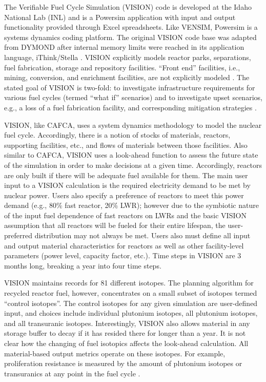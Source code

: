 The Verifiable Fuel Cycle Simulation (VISION) code is developed at the Idaho
National Lab (INL) and is a Powersim \cite{studio_powersim_2003} application
with input and output functionality provided through Excel spreadsheets. Like
VENSIM, Powersim is a systems dynamics coding platform. The original VISION code
base was adapted from DYMOND \cite{moisseytsev_dymond_2001} after internal
memory limits were reached in its application language, iThink/Stella
\cite{richmond_ithink_2004}. VISION explicitly models reactor parks, 
separations, fuel fabrication, storage and repository facilities. ``Front end''
facilities, i.e., mining, conversion, and enrichment facilities, are not
explicitly modeled \cite{guerin_benchmark_2009}. The stated goal of VISION is
two-fold: to investigate infrastructure requirements for various fuel cycles
(termed ``what if'' scenarios) \cite{jacobson_verifiable_2010} and to
investigate upset scenarios, e.g., a loss of a fuel fabrication facility, and
corresponding mitigation strategies \cite{schweitzer_improved_2008}.

VISION, like CAFCA, uses a system dynamics methodology to model the nuclear fuel
cycle. Accordingly, there is a notion of stocks of materials, reactors,
supporting facilities, etc., and flows of materials between those
facilities. Also similar to CAFCA, VISION uses a look-ahead function to assess
the future state of the simulation in order to make decisions at a given
time. Accordingly, reactors are only built if there will be adequate fuel
available for them. The main user input to a VISION calculation is the required
electricity demand to be met by nuclear power. Users also specify a preference
of reactors to meet this power demand (e.g., 80\% fast reactor, 20\% LWR);
however due to the symbiotic nature of the input fuel dependence of fast
reactors on LWRs and the basic VISION assumption that all reactors will be
fueled for their entire lifespan, the user-preferred distribution may not always
be met. Users also must define all input and output material characteristics for
reactors as well as other facility-level parameters (power level, capacity
factor, etc.). Time steps in VISION are 3 months long, breaking a year into four
time steps.

VISION maintains records for 81 different isotopes. The planning algorithm for
recycled reactor fuel, however, concentrates on a small subset of isotopes
termed ``control isotopes''. The control isotopes for any given simulation are
user-defined input, and choices include individual plutonium isotopes, all
plutonium isotopes, and all transuranic isotopes. Interestingly, VISION also
allows material in any storage buffer to decay if it has resided there for
longer than a year. It is not clear how the changing of fuel isotopics affects
the look-ahead calculation. All material-based output metrics operate on these
isotopes. For example, proliferation resistance is measured by the amount of
plutonium isotopes or transuranics at any point in the fuel cycle
\cite{yacout_vision_2006}.

